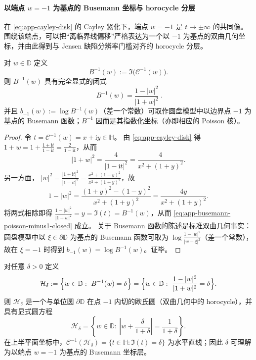 \paragraph{以端点 \texorpdfstring{$w=-1$}{w=-1} 为基点的 Busemann 坐标与 horocycle 分层}\label{par:app-horocycle-busemann}
在 \eqref{eq:app-cayley-disk} 的 Cayley 紧化下，端点 \(w=-1\) 是 \(t\to\pm\infty\) 的共同像。
围绕该端点，可以把“离临界线偏移”严格表达为一个以 \(-1\) 为基点的双曲几何坐标，并由此得到与 Jensen 缺陷分辨率门槛对齐的 horocycle 分层。

\begin{proposition}\label{prop:app-busemann-poisson-minus1}
对 \(w\in\mathbb{D}\) 定义
\[
B^{-1}(w):=\Im\bigl(\mathcal{C}^{-1}(w)\bigr).
\]
则 \(B^{-1}(w)\) 具有完全显式的闭式
\begin{equation}\label{eq:app-busemann-poisson-minus1-closed}
\boxed{\;
B^{-1}(w)
=\frac{1-|w|^{2}}{|1+w|^{2}}
\; }.
\end{equation}
并且 \(b_{-1}(w):=\log B^{-1}(w)\)（差一个常数）可取作圆盘模型中以边界点 \(-1\) 为基点的 Busemann 函数；\(B^{-1}\) 因而是其指数化坐标（亦即相应的 Poisson 核）。
\end{proposition}

\begin{proof}
令 \(t=\mathcal{C}^{-1}(w)=x+\mathrm{i}y\in\mathbb{H}\)。
由 \eqref{eq:app-cayley-disk} 得
\(
1+w=1+\frac{1+\mathrm{i}t}{1-\mathrm{i}t}=\frac{2}{1-\mathrm{i}t}
\)，从而
\[
|1+w|^{2}=\frac{4}{|1-\mathrm{i}t|^{2}}
=\frac{4}{x^{2}+(1+y)^{2}}.
\]
另一方面，
\(
|w|^{2}=\frac{|1+\mathrm{i}t|^{2}}{|1-\mathrm{i}t|^{2}}
=\frac{x^{2}+(1-y)^{2}}{x^{2}+(1+y)^{2}}
\)，故
\[
1-|w|^{2}
=\frac{(1+y)^{2}-(1-y)^{2}}{x^{2}+(1+y)^{2}}
=\frac{4y}{x^{2}+(1+y)^{2}}.
\]
将两式相除即得
\(
\frac{1-|w|^{2}}{|1+w|^{2}}=y=\Im(t)=B^{-1}(w)
\)，从而 \eqref{eq:app-busemann-poisson-minus1-closed} 成立。
关于 Busemann 函数的陈述是标准双曲几何事实：圆盘模型中以 \(\xi\in\partial\mathbb{D}\) 为基点的 Busemann 函数可取为 \(\log\frac{1-|w|^{2}}{|w-\xi|^{2}}\)（差一个常数），故在 \(\xi=-1\) 时得到 \(b_{-1}(w)=\log B^{-1}(w)\)。证毕。
\end{proof}

\begin{theorem}[horocycle 分层：\texorpdfstring{$B^{-1}(w)=\delta$}{Bminus1=delta} 的水平集是内切圆]\label{thm:app-horocycle-foliation-minus1}
对任意 \(\delta>0\) 定义
\[
\mathcal{H}_{\delta}:=\Bigl\{w\in\mathbb{D}:\ B^{-1}(w)=\delta\Bigr\}
=\Bigl\{w\in\mathbb{D}:\ \frac{1-|w|^{2}}{|1+w|^{2}}=\delta\Bigr\}.
\]
则 \(\mathcal{H}_{\delta}\) 是一个与单位圆 \(\partial\mathbb{D}\) 在点 \(-1\) 内切的欧氏圆（双曲几何中的 horocycle），并具有显式圆方程
\begin{equation}\label{eq:app-horocycle-circle-euclid}
\boxed{\;
\mathcal{H}_{\delta}
=\left\{w\in\mathbb{D}:\ \left|w+\frac{\delta}{1+\delta}\right|=\frac{1}{1+\delta}\right\}.
\;}
\end{equation}
在上半平面坐标中，\(\mathcal{C}^{-1}(\mathcal{H}_{\delta})=\{t\in\mathbb{H}:\Im(t)=\delta\}\) 为水平直线；因此 \(\delta\) 可理解为以端点 \(w=-1\) 为基点的 Busemann 坐标层。
\end{theorem}

